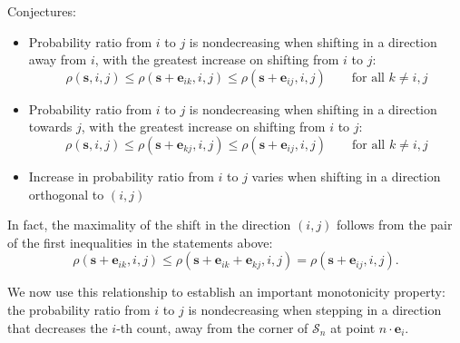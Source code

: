 \documentclass[11pt,draft]{article}
\newcommand{\Ssp}{\mathcal{S}}
\newcommand{\sv}{\mathbf{s}}
\newcommand{\ev}{\mathbf{e}}
\begin{document}
Conjectures:
\begin{itemize}
\item Probability ratio from $i$ to $j$ is nondecreasing when shifting in a
direction away from $i$, with the greatest increase on shifting from $i$ to $j$:
\begin{equation}
\rho(\sv, i, j) \leq \rho(\sv + \ev_{ik}, i, j) \leq
\rho(\sv + \ev_{ij}, i, j) \qquad\text{for all } k \neq i,j
\end{equation}

\item Probability ratio from $i$ to $j$ is nondecreasing when shifting in a
direction towards $j$, with the greatest increase on shifting from $i$ to $j$:
\begin{equation}
\rho(\sv, i, j) \leq \rho(\sv + \ev_{kj}, i, j) \leq
\rho(\sv + \ev_{ij}, i, j) \qquad\text{for all } k \neq i,j
\end{equation}

\item Increase in probability ratio from $i$ to $j$ varies when shifting in a
direction orthogonal to $(i, j)$

\end{itemize}
In fact, the maximality of the shift in the direction $(i, j)$ follows from the
pair of the first inequalities in the statements above:
\[ \rho(\sv + \ev_{ik}, i, j) \leq \rho(\sv + \ev_{ik} + \ev_{kj}, i, j) =
\rho(\sv + \ev_{ij}, i, j). \]

\hrulefill

We now use this relationship to establish an important monotonicity property:
the probability ratio from $i$ to $j$ is nondecreasing when stepping in a
direction that decreases the $i$-th count, \ie away from the corner of $\Ssp_n$
at point $n\cdot\ev_i$.
\end{document}
